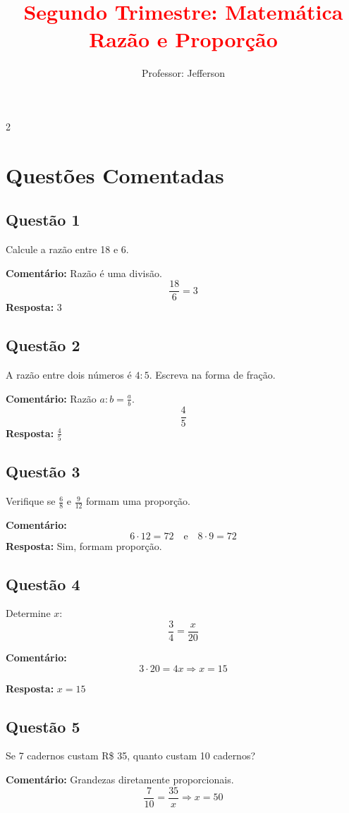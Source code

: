 \documentclass[11pt]{article}
\title{\textcolor{red}{Segundo Trimestre: Matemática
\\Razão e Proporção}}
\author{Professor: Jefferson}
\date{}
\begin{document}
\maketitle
\vspace{-1cm}

\begin{multicols}{2}

\section*{Questões Comentadas}

\subsection*{Questão 1}
Calcule a razão entre 18 e 6.

\textbf{Comentário:} Razão é uma divisão.
\[
\frac{18}{6} = 3
\]
\textbf{Resposta:} 3

\subsection*{Questão 2}
A razão entre dois números é $4:5$. Escreva na forma de fração.

\textbf{Comentário:} Razão $a:b = \frac{a}{b}$.
\[
\frac{4}{5}
\]
\textbf{Resposta:} $\frac{4}{5}$

\subsection*{Questão 3}
Verifique se $\frac{6}{8}$ e $\frac{9}{12}$ formam uma proporção.

\textbf{Comentário:}
\[
6 \cdot 12 = 72 \quad \text{e} \quad 8 \cdot 9 = 72
\]
\textbf{Resposta:} Sim, formam proporção.

\subsection*{Questão 4}
Determine $x$:
\[
\frac{3}{4} = \frac{x}{20}
\]

\textbf{Comentário:}
\[
3 \cdot 20 = 4x \Rightarrow x = 15
\]

\textbf{Resposta:} $x = 15$

\subsection*{Questão 5}
Se 7 cadernos custam R\$ 35, quanto custam 10 cadernos?

\textbf{Comentário:} Grandezas diretamente proporcionais.
\[
\frac{7}{10} = \frac{35}{x}
\Rightarrow x = 50
\]


\end{multicols}
\end{document}
